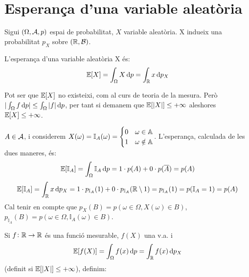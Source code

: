
\section{Esperança d'una variable aleatòria}

Sigui $(\Omega,\mathcal{A},p)$ espai de probabilitat, $X$ variable aleatòria. X indueix una probabilitat $p_X$ sobre $(\mathbb{R},\mathcal{B})$.

\begin{defi}
    L'esperança d'una variable aleatòria X és:
    \[\esp[X] = \int_{\Omega}{X \dif p} = \int_{\real}{x \dif p_X}\]
\end{defi}

\begin{obs}
    Pot ser que $\operatorname{\mathbb{E}}[X]$ no existeixi, com al curs de teoria de la mesura.
    Però $|\int_{\Omega}{f\dif p}| \le \int_{\Omega}{|f|\dif p}$,
    per tant si demanem que $\operatorname{\mathbb{E}}[|X|] \le +\infty$ aleshores $\operatorname{\mathbb{E}}[X] \le +\infty$.
\end{obs}

\begin{example}
    $A\in\mathcal{A}$, i considerem $X(\omega) = \mathbb{I}_A(\omega) = \begin{cases}
    0 & \omega \in \mathbb{A} \\ 1 & \omega \notin \mathbb{A} \end{cases}$. L'esperança, calculada de les dues maneres, és:
    \[\esp[\mathbb{I}_A] = \int_\Omega{\mathbb{I}_A \dif p} = 1\cdot p(A) + 0\cdot p(\comp{A}) = p(A) \]
    \[\esp[\mathbb{I}_A] = \int_\real{x\dif p_X} = 1\cdot p_{\mathbb{I}_A}(1) + 0\cdot p_{\mathbb{I}_A}(\real\setminus1) =
    p_{\mathbb{I}_A}(1) = p(\mathbb{I}_A = 1) = p(A)\]
    Cal tenir en compte que $p_X(B) = p(\omega\in\Omega, X(\omega)\in B)$, $p_{\mathbb{I}_A}(B) = p(\omega\in\Omega, \mathbb{I}_A(\omega)\in B)$.
\end{example}

Si $f\colon\mathbb{R}\to\mathbb{R}$ és una funció mesurable, $f(X)$ una v.a. i
\[\esp[f(X)] = \int_{\Omega}{f(x) \dif p} = \int_\real{f(x) \dif p_X}\]
(definit si $\operatorname{\mathbb{E}}[|X|] \le +\infty$), definim:




